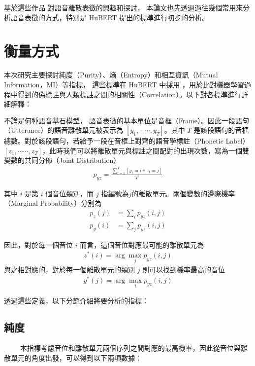 基於這些作品
對語音離散表徵的興趣和探討，  %
本論文也先透過過往幾個常用來分析語音表徵的方式，特別是
HuBERT \cite{hsu_hubert_2021-2} 提出的標準進行初步的分析。

\section{衡量方式}


本次研究主要探討純度（Purity）、熵（Entropy）和相互資訊（Mutual Information，MI）等指標，
這些標準在 HuBERT 中採用 \cite{hsu_hubert_2021, hsu_hubert_2021-2}，用於比對機器學習過程中得到的偽標註與人類標註之間的相關性（Correlation）。以下對各標準進行詳細解釋：

不論是何種語音基石模型，
語音表徵的基本單位是音框（Frame）。因此一段語句（Utterance）的語音離散單元被表示為 $[y_1, \cdots\cdots, y_T]$。其中 $T$ 是該段語句的音框總數。對於該段語句，若給予一段在音框上對齊的語音學標註（Phonetic Label） $[z_1, \cdots\cdots, z_T]$，此時我們可以將離散單元與標註之間配對的出現次數，寫為一個雙變數的共同分佈（Joint Distribution）
\begin{align}
    p_{yz} = \frac{\sum^T_{t=1}[{y_t = i \wedge z_t = j}]}{T}
\end{align}

其中 $i$ 是第 $i$ 個音位類別，而 $j$ 指編號為$j$的離散單元。兩個變數的邊際機率（Marginal Probability）分別為
\begin{align}
    p_z(j) & =\sum_i{p_{yz}(i, j)} \\
    p_y(i) & =\sum_j{p_{yz}(i, j)}
\end{align}

因此，對於每一個音位 $i$ 而言，這個音位對應最可能的離散單元為
\begin{align}
    z^\ast(i) = \arg\max_j p_{yz}(i, j)
\end{align}
與之相對應的，對於每一個離散單元的類別 $j$ 則可以找到機率最高的音位
\begin{align}
    y^\ast(j) = \arg\max_i p_{yz}(i,j)
\end{align}

透過這些定義，以下分節介紹將要分析的指標：

\subsection{純度}
　　
本指標考慮音位和離散單元兩個序列之間對應的最高機率，因此從音位與離散單元的角度出發，可以得到以下兩項數據：

